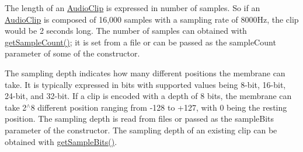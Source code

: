 The length of an \hyperlink{classbridges_1_1base_1_1_audio_clip}{Audio\+Clip} is expressed in number of samples. So if an \hyperlink{classbridges_1_1base_1_1_audio_clip}{Audio\+Clip} is composed of 16,000 samples with a sampling rate of 8000\+Hz, the clip would be 2 seconds long. The number of samples can obtained with \hyperlink{classbridges_1_1base_1_1_audio_clip_a8ad739b7a085787028b4278d65b1b3f4}{get\+Sample\+Count()}; it is set from a file or can be passed as the sample\+Count parameter of some of the constructor.

The sampling depth indicates how many different positions the membrane can take. It is typically expressed in bits with supported values being 8-\/bit, 16-\/bit, 24-\/bit, and 32-\/bit. If a clip is encoded with a depth of 8 bits, the membrane can take 2$^\wedge$8 different position ranging from -\/128 to +127, with 0 being the resting position. The sampling depth is read from files or passed as the sample\+Bits parameter of the constructor. The sampling depth of an existing clip can be obtained with \hyperlink{classbridges_1_1base_1_1_audio_clip_a59e5a3f38768e52c15e43b5679f3f09c}{get\+Sample\+Bits()}.

